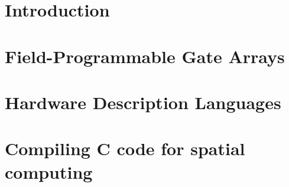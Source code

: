 \section{Introduction}
\label{reconfigurableComputing:introduction}


\section{Field-Programmable Gate Arrays}
\label{fpga}


\section{Hardware Description Languages}
\label{hdl}


\section{Compiling C code for spatial computing}
\label{cForSpatial}

